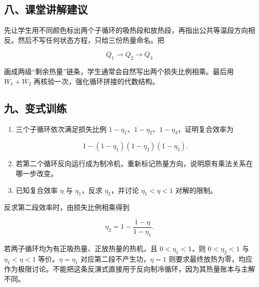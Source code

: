 \documentclass[12pt,a4paper,UTF8]{ctexart}
\begin{document}
\subsection{八、课堂讲解建议}\label{ux516bux8bfeux5802ux8bb2ux89e3ux5efaux8bae-7}

先让学生用不同颜色标出两个子循环的吸热段和放热段，再指出公共等温段方向相反。然后不写任何状态方程，只给三份热量命名。把

\[Q_1\longrightarrow Q_2\longrightarrow Q_3\]

画成两级``剩余热量''链条，学生通常会自然写出两个损失比例相乘。最后用
\(W_1+W_2\) 再核验一次，强化循环拼接的代数结构。

\subsection{九、变式训练}\label{ux4e5dux53d8ux5f0fux8badux7ec3-7}

\begin{enumerate}
\def\labelenumi{\arabic{enumi}.}
\item
  三个子循环依次满足损失比例
  \(1-\eta_1\)、\(1-\eta_2\)、\(1-\eta_3\)，证明复合效率为

  \[1-(1-\eta_1)(1-\eta_2)(1-\eta_3).\]
\item
  若第二个循环反向运行成为制冷机，重新标记热量方向，说明原有乘法关系在哪一步改变。
\item
  已知复合效率 \(\eta\) 与 \(\eta_1\)，反求 \(\eta_2\)，并讨论
  \(\eta_1<\eta<1\) 对解的限制。
\end{enumerate}

反求第二段效率时，由损失比例相乘得到

\[\eta_2=1-\frac{1-\eta}{1-\eta_1}.\]

若两子循环均为有正吸热量、正放热量的热机，且 \(0<\eta_1<1\)，则
\(0<\eta_2<1\) 与 \(\eta_1<\eta<1\) 等价。\(\eta=\eta_1\)
对应第二段不产生功，\(\eta=1\)
则要求最终放热为零，均应作为极限讨论。不能把这条反演式直接用于反向制冷循环，因为其热量账本与主解不同。
\end{document}
